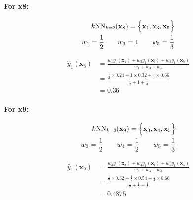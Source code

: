 \documentclass[12pt]{article}
\begin{document}
\begin{enumerate}[leftmargin=\labelsep]
\begin{enumerate}
        \paragraph{For x8:}

        \begin{equation}
        \begin{split}
            k\textrm{NN}_{k = 3}(\mathbf{x}_8) = \Bigl\{ \mathbf{x}_1, \mathbf{x}_3, \mathbf{x}_5\Bigr\} \\
            w_1 = \frac{1}{2} \qquad w_3 = 1 \qquad w_5 = \frac{1}{3}
        \end{split}
        \end{equation}

        \begin{equation}
        \begin{split}
            \hat{y}_1(\mathbf{x}_8) &= \frac{w_1y_1(\mathbf{x}_1) + w_3y_1(\mathbf{x}_3) + w_5y_1(\mathbf{x}_5)}{w_1 + w_3 + w_5} \\
            &= \frac{\frac{1}{2} \times 0.24 + 1 \times 0.32 + \frac{1}{3} \times 0.66}{\frac{1}{2} + 1 + \frac{1}{3}} \\
            &= 0.36
        \end{split}
        \end{equation}

        \paragraph{For x9:}

        \begin{equation}
        \begin{split}
            k\textrm{NN}_{k = 3}(\mathbf{x}_9) = \Bigl\{ \mathbf{x}_3, \mathbf{x}_4, \mathbf{x}_5\Bigr\} \\
            w_3 = \frac{1}{2} \qquad w_4 = \frac{1}{2} \qquad w_5 = \frac{1}{3}
        \end{split}
        \end{equation}

        \begin{equation}
        \begin{split}
            \hat{y}_1(\mathbf{x}_9) &= \frac{w_3y_1(\mathbf{x}_3) + w_4y_1(\mathbf{x}_4) + w_5y_1(\mathbf{x}_5)}{w_3 + w_4 + w_5} \\
            &= \frac{\frac{1}{2} \times 0.32 + \frac{1}{2} \times 0.54 + \frac{1}{3} \times 0.66}{\frac{1}{2} + \frac{1}{2} + \frac{1}{3}} \\
            &= 0.4875
        \end{split}
        \end{equation}


\end{enumerate}
\end{enumerate}
\end{document}
